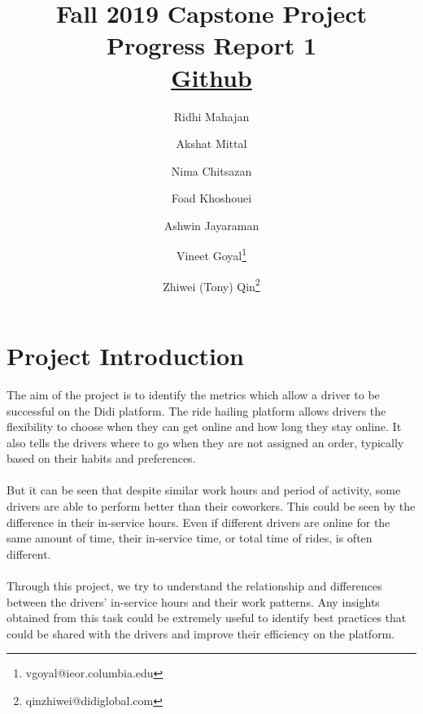 \documentclass[11pt]{article}
\begin{document}
\title{Fall 2019 Capstone Project Progress Report 1 \\
    \small \href{https://github.com/rmahajan14/capstone_didi}{Github}}

%

\author[1]{Ridhi Mahajan}
\author[2]{Akshat Mittal}
\author[3]{Nima Chitsazan}
\author[4]{Foad Khoshouei}
\author[5]{Ashwin Jayaraman}
\author[6]{Vineet Goyal\thanks{vgoyal@ieor.columbia.edu}} 
\author[7]{Zhiwei (Tony) Qin\thanks{qinzhiwei@didiglobal.com}}





\maketitle              %
%

%
%
%
\section{Project Introduction}
The aim of the project is to identify the metrics which allow a driver to be successful on the Didi platform. The ride hailing platform allows drivers the flexibility to choose when they can get online and how long they stay online. It also tells the drivers where to go when they are not assigned an order, typically based on their habits and preferences. 
\\\\
But it can be seen that despite similar work hours and period of activity, some drivers are able to perform better than their coworkers.  This could be seen by the difference in their in-service hours. Even if different drivers are online for the same amount of time, their in-service time, or total time of rides, is often different. 
\\\\
Through this project, we try to understand the relationship and differences between the drivers' in-service hours and their work patterns. Any insights obtained from this task could be extremely useful to identify best practices that could be shared with the drivers and improve their efficiency on the platform.
\end{document}
